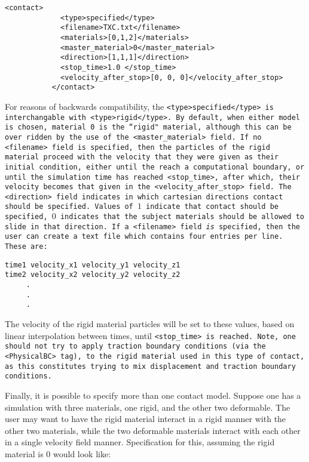\begin{Verbatim}[fontsize=\footnotesize]
           <contact>
             <type>specified</type>
             <filename>TXC.txt</filename>
             <materials>[0,1,2]</materials>
             <master_material>0</master_material>
             <direction>[1,1,1]</direction>
             <stop_time>1.0 </stop_time>
             <velocity_after_stop>[0, 0, 0]</velocity_after_stop>
           </contact>
\end{Verbatim}
For reasons of backwards compatibility, the
\tt <type>specified</type> \normalfont is interchangable with
\tt <type>rigid</type>. \normalfont  By default, when either model is
chosen, material 0 is the ``rigid" material, although this can be
over ridden by the use of the
\tt <master\_material> \normalfont field.  If no
\tt <filename> \normalfont field is specified, then the particles of the
rigid material proceed with the velocity that they were given as their
initial condition, either until the reach a computational boundary, or
until the simulation time has reached \tt <stop\_time>, \normalfont after
which, their velocity becomes that given in the
\tt <velocity\_after\_stop> \normalfont field.  The \tt <direction> \normalfont
field indicates in which cartesian directions contact should be specified.
Values of $1$ indicate that contact should be specified, $0$ indicates that
the subject materials should be allowed to slide in that direction.  If
a \tt <filename> \normalfont field {\it is} specified, then the user can
create a text file which contains four entries per line.  These are:
\begin{Verbatim}[fontsize=\footnotesize]
time1 velocity_x1 velocity_y1 velocity_z1
time2 velocity_x2 velocity_y2 velocity_z2
     .
     .
     .
\end{Verbatim}
The velocity of the rigid material particles will be set to these values,
based on linear interpolation between times, until \tt <stop\_time> \normalfont
is reached.  Note, one should not try to apply traction boundary conditions
(via the  \verb|<PhysicalBC>| tag), to the rigid material used in this type of contact, as this constitutes trying to mix displacement and traction boundary
conditions. 

Finally, it is possible to specify more than one contact model.  Suppose
one has a simulation with three materials, one rigid, and the other two
deformable.  The user may want to have the rigid material interact in a
rigid manner with the other two materials, while the two deformable materials
interact with each other in a single velocity field manner.  Specification
for this, assuming the rigid material is $0$ would look like:

